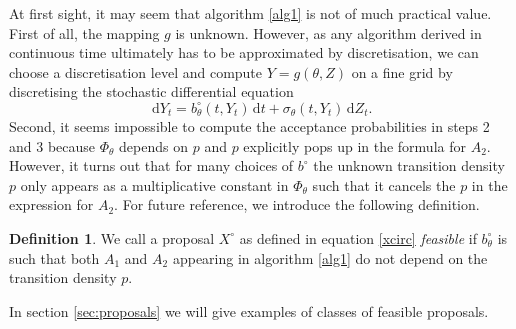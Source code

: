 \documentclass[preprint]{imsart}
\newcommand{\si}{\sigma}
\renewcommand{\th}{\theta}
\theoremstyle{definition}
\newtheorem{defn}[thm]{Definition}
\newcommand{\dd}{{\,\mathrm d}}
\begin{document}
At first sight, it may seem that algorithm \ref{alg1} is not of much practical value. First of all, the mapping $g$ is unknown. However, as any algorithm derived in continuous time ultimately has to be approximated by discretisation, we can choose a discretisation level and compute $Y = g(\th, Z)$ on a fine grid by discretising the stochastic differential equation
\[ \dd Y_t = b^\circ_\th(t, Y_t) \dd t + \si_\th(t, Y_t) \dd Z_t. \]
Second, it seems impossible to compute the acceptance probabilities in steps 2 and 3 because $\Phi_\th$ depends on $p$ and $p$ explicitly pops up in the formula for $A_2$. However, it turns out that for many choices of $b^\circ$ the unknown transition density $p$ only appears as a multiplicative constant in $\Phi_\th$ such that it cancels the $p$ in the expression for $A_2$. For future reference, we introduce the following definition. 
\begin{defn}\label{def:feasible}
We call a proposal $X^\circ$ as defined in equation \eqref{xcirc} {\it feasible} if $b^\circ_\th$ is such that both $A_1$ and $A_2$ appearing in algorithm \ref{alg1} do not depend on the transition density $p$.
\end{defn}

In section \ref{sec:proposals} we will give examples of classes of feasible proposals. 





\end{document}
